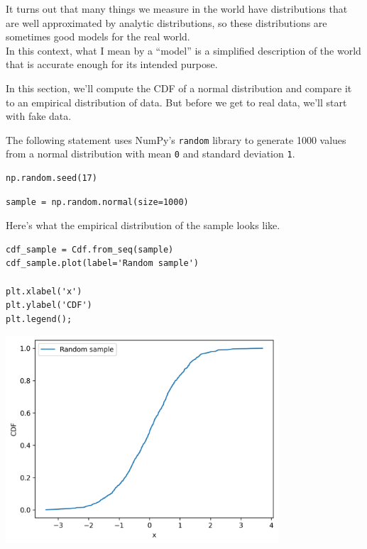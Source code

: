 It turns out that many things we measure in the world have distributions
that are well approximated by analytic distributions, so these
distributions are sometimes good models for the real world.\\
In this context, what I mean by a ``model'' is a simplified description
of the world that is accurate enough for its intended purpose.

In this section, we'll compute the CDF of a normal distribution and
compare it to an empirical distribution of data. But before we get to
real data, we'll start with fake data.

The following statement uses NumPy's \passthrough{\lstinline!random!}
library to generate 1000 values from a normal distribution with mean
\passthrough{\lstinline!0!} and standard deviation
\passthrough{\lstinline!1!}.

\begin{lstlisting}[]
np.random.seed(17)
\end{lstlisting}

\begin{lstlisting}[]
sample = np.random.normal(size=1000)
\end{lstlisting}

Here's what the empirical distribution of the sample looks like.

\begin{lstlisting}[]
cdf_sample = Cdf.from_seq(sample)
cdf_sample.plot(label='Random sample')

plt.xlabel('x')
plt.ylabel('CDF')
plt.legend();
\end{lstlisting}

\begin{center}
\includegraphics[width=4in]{chapters/08_distributions_files/08_distributions_109_0.png}
\end{center}


